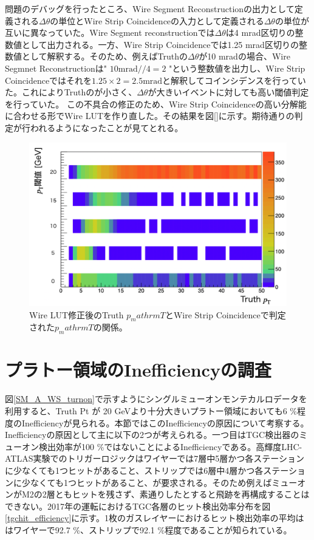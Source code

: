 問題のデバッグを行ったところ、Wire Segment Reconstructionの出力として定義される$\Delta\theta$の単位とWire Strip Coincidenceの入力として定義される$\Delta\theta$の単位が互いに異なっていた。Wire Segment reconstructionでは$\Delta\theta$は4 mrad区切りの整数値として出力される。一方、Wire Strip Coincidenceでは1.25 mrad区切りの整数値として解釈する。そのため、例えばTruthの$\Delta\theta$が10 mradの場合、Wire Segmnet Reconstructionは" $10 \mathrm{mrad} //4 = 2$ "という整数値を出力し、Wire Strip Coincidenceではそれを$1.25 \times 2 = 2.5 \mathrm{mrad}$と解釈してコインシデンスを行っていた。これによりTruthの\pt が小さく、$\Delta\theta$が大きいイベントに対しても高い\pt 閾値判定を行っていた。
この不具合の修正のため、Wire Strip Coincidenceの高い分解能に合わせる形でWire LUTを作り直した。その結果を図\ref{}に示す。期待通りの\pt 判定が行われるようになったことが見てとれる。
 
\begin{figure} 
\centering
\includegraphics[width=16cm]{fig/Test/pt_after.png}
\caption[]{Wire LUT修正後のTruth $p_mathrm{T}$とWire Strip Coincidenceで判定された$p_mathrm{T}$の関係。}
\label{fig_CTA}
\end{figure}



\section{プラトー領域のInefficiencyの調査}
\label{sec:appendix:plateau}
図\ref{SM_A_WS_turnon}で示すようにシングルミューオンモンテカルロデータを利用すると、Truth Pt が 20 GeVより十分大きいプラトー領域においても6 \%程度のInefficiencyが見られる。本節ではこのInefficiencyの原因について考察する。
Inefficiencyの原因として主に以下の2つが考えられる。一つ目はTGC検出器のミューオン検出効率が100 \%ではないことによるInefficiencyである。高輝度LHC-ATLAS実験でのトリガーロジックはワイヤーでは7層中5層かつ各ステーションに少なくても1つヒットがあること、ストリップでは6層中4層かつ各ステーションに少なくても1つヒットがあること、が要求される。そのため例えばミューオンがM2の2層ともヒットを残さず、素通りしたとすると飛跡を再構成することはできない。2017年の運転におけるTGC各層のヒット検出効率分布を図\ref{tgchit_efficiency}に示す。1枚のガスレイヤーにおけるヒット検出効率の平均ははワイヤーで92.7 \%、ストリップで92.1 \%程度であることが知られている。

